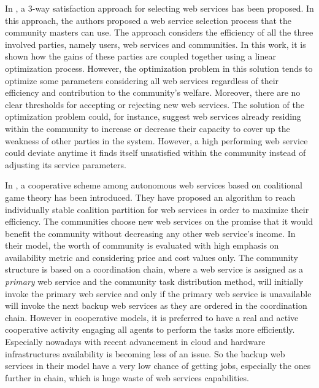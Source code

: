 In \cite{DBLP:conf/IEEEscc/LimTMB12}, a 3-way satisfaction approach
for selecting web services has been proposed. In this approach,
the authors proposed a web service selection process that the
community masters can use. The approach considers the efficiency
of all the three involved parties, namely users, web services and
communities. In this work, it is shown how the gains of these
parties are coupled together using a linear optimization process.
However, the optimization problem in this solution tends to
optimize some parameters considering all web services regardless
of their efficiency and contribution to the community's welfare.
Moreover, there are no clear thresholds for accepting or rejecting
new web services. The solution of the optimization problem could,
for instance, suggest web services already residing within the
community to increase or decrease their capacity to cover up the
weakness of other parties in the system. However, a high
performing web service could deviate anytime it finds itself
unsatisfied within the community instead of adjusting its service
parameters.

In \cite{10.1109/TSC.2012.12}, a cooperative scheme among autonomous
web services based on coalitional game theory has been introduced. They have proposed an algorithm to
reach individually stable coalition partition for web services in order to
maximize their efficiency. The communities choose new web services on the promise
that it would benefit the community without decreasing any other web service's
income. In their model, the worth of community is evaluated with high emphasis on
availability metric and considering price and cost values only. The community structure is based on a coordination chain,
where a web service is assigned as a \emph{primary} web service and the community task distribution
method, will initially invoke the primary web service and only if the primary web service is unavailable
will invoke the next backup web services as they are ordered in the coordination chain. However in cooperative models, it is preferred to
have a real and active cooperative activity engaging all agents to perform the tasks more efficiently. Especially nowadays
with recent advancement in cloud and hardware infrastructures availability is becoming less of an issue. So the backup web services
in their model have a very low chance of getting jobs, especially the ones further in chain, which is huge waste of web services
capabilities.


